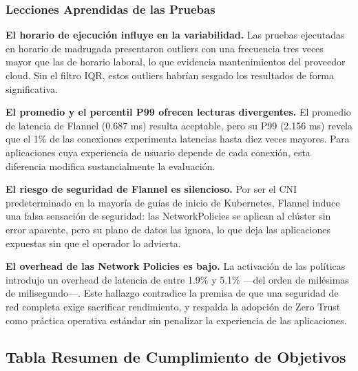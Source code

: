 \subsubsection{Lecciones Aprendidas de las Pruebas}

\textbf{El horario de ejecución influye en la variabilidad.} Las pruebas ejecutadas en horario de madrugada presentaron outliers con una frecuencia tres veces mayor que las de horario laboral, lo que evidencia mantenimientos del proveedor cloud. Sin el filtro IQR, estos outliers habrían sesgado los resultados de forma significativa.

\textbf{El promedio y el percentil P99 ofrecen lecturas divergentes.} El promedio de latencia de Flannel (0.687 ms) resulta aceptable, pero su P99 (2.156 ms) revela que el 1\% de las conexiones experimenta latencias hasta diez veces mayores. Para aplicaciones cuya experiencia de usuario depende de cada conexión, esta diferencia modifica sustancialmente la evaluación.

\textbf{El riesgo de seguridad de Flannel es silencioso.} Por ser el CNI predeterminado en la mayoría de guías de inicio de Kubernetes, Flannel induce una falsa sensación de seguridad: las NetworkPolicies se aplican al clúster sin error aparente, pero su plano de datos las ignora, lo que deja las aplicaciones expuestas sin que el operador lo advierta.

\textbf{El overhead de las Network Policies es bajo.} La activación de las políticas introdujo un overhead de latencia de entre 1.9\% y 5.1\% ---del orden de milésimas de milisegundo---. Este hallazgo contradice la premisa de que una seguridad de red completa exige sacrificar rendimiento, y respalda la adopción de Zero Trust como práctica operativa estándar sin penalizar la experiencia de las aplicaciones.

\subsection{Tabla Resumen de Cumplimiento de Objetivos}

